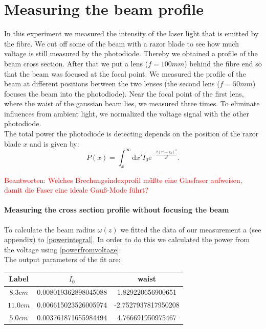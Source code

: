 \documentclass{article}
\begin{document}
\section{Measuring the beam profile}

In this experiment we measured the intensity of the laser light that is emitted by the fibre. We cut off some of the beam with a razor blade to see how much voltage is still measured by the photodiode. Thereby we obtained a profile of the beam cross section. After that we put a lens ($f=100mm$) behind the fibre end so that the beam was focused at the focal point. We measured the profile of the beam at different positions between the two lenses (the second lens ($f=50mm$) focuses the beam into the photodiode). Near the focal point of the first lens, where the waist of the gaussian beam lies, we measured three times. To eliminate influences from ambient light, we normalized the voltage signal with the other photodiode.\\

The total power the photodiode is detecting depends on the position of the razor blade $x$ and is given by:
\begin{equation}
P(x) = \int_x^\infty\mathrm{d}x' I_0 \mathrm{e}^{-\frac{2(x'-x_0)^2}{\omega^2}}.
\label{powerintegral}
\end{equation}

\textcolor{red}{Beantworten: Welches Brechungsindexprofil müßte eine Glasfaser aufweisen, damit die Faser eine ideale Gauß-Mode führt?}

\paragraph{Measuring the cross section profile without focusing the beam}

To calculate the beam radius $\omega (z)$ we fitted the data of our measurement a (see appendix) to \ref{powerintegral}. In order to do this we calculated the power from the voltage using \ref{powerfromvoltage}. \\

The output parameters of the fit are:

\begin{tabular}{ccc}
\hline
Label & $I_{0}$ & waist \\ 
\hline
$8.3cm$ & 0.008019362898045088 & 1.829220656900651 \\ 
\hline
$11.0 cm$ & 0.006615023526005974 & -2.7527937817950208 \\ 
\hline
$5.0cm$ & 0.003761871655984494 & 4.766691950975467 \\
\hline
\end{tabular}
\end{document}
